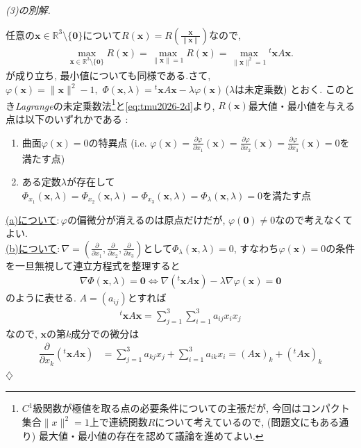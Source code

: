 \documentclass[titlepage]{jsarticle}
\numberwithin{equation}{section}
\newcommand{\R}{\mathbb{R}}%
\newenvironment{kaitou}[1][解]{%
\begin{proofbox}%
\textit{#1. }\ignorespaces
}{%
\hfill$\diamondsuit$%
\end{proofbox}%
}
\begin{document}
\begin{kaitou}[(3)の別解]
任意の$\bm{x}\in\R^3\setminus\{\bm{0}\}$について$R(\bm{x}) = R\left(\frac{\bm{x}}{\|\bm{x}\|}\right)$なので, 
\begin{align}
\max_{\bm{x}\in\R^3\setminus\{\bm{0}\}}R(\bm{x}) = \max_{\|\bm{x}\|=1}R(\bm{x}) =
\max_{\|\bm{x}\|^2=1}{}^t\bm{x}A\bm{x}.
\label{eq:tmu2026-2d}
\end{align}
が成り立ち, 最小値についても同様である.さて, $\varphi(\bm{x}) = \|\bm{x}\|^2 - 1,\,\, \Phi(\bm{x}, \lambda) = {}^t\bm{x}A\bm{x} - \lambda\varphi(\bm{x})$\,($\lambda$は未定乗数) とおく. このとき\textit{Lagrange}の未定乗数法\footnote{$C^1$級関数が極値を取る点の必要条件についての主張だが, 今回はコンパクト集合$\|x\|^2 = 1$上で連続関数$R$について考えているので, (問題文にもある通り) 最大値・最小値の存在を認めて議論を進めてよい.}と\eqref{eq:tmu2026-2d}より, $R(\bm{x})$最大値・最小値を与える点は以下のいずれかである :
\begin{enumerate}[label = (\alph*)]
\item 曲面$\varphi(\bm{x}) = 0$の特異点 (i.e. $\varphi(\bm{x}) = \frac{\partial\varphi}{\partial x_1}(\bm{x}) = \frac{\partial\varphi}{\partial x_2}(\bm{x}) = \frac{\partial\varphi}{\partial x_3}(\bm{x}) = 0$を満たす点)
\item ある定数$\lambda$が存在して $\Phi_{x_1}(\bm{x}, \lambda) = \Phi_{x_2}(\bm{x}, \lambda) = \Phi_{x_3}(\bm{x}, \lambda) = \Phi_{\lambda}(\bm{x}, \lambda) = 0$を満たす点
\end{enumerate}
\uline{(a)について}:\,$\varphi$の偏微分が消えるのは原点だけだが, $\varphi(\bm{0}) \ne 0$なので考えなくてよい.\\
\uline{(b)について}:\,$\nabla = \left(\frac{\partial}{\partial x_1}, \frac{\partial}{\partial x_2}, \frac{\partial}{\partial x_3}\right)$として$\Phi_\lambda(\bm{x}, \lambda) = 0$, すなわち$\varphi(\bm{x}) = 0$の条件を一旦無視して連立方程式を整理すると
\begin{align}
\nabla \Phi(\bm{x}, \lambda) = \bm{0} \iff \nabla\left({}^t\bm{x}A\bm{x}\right) - \lambda\nabla\varphi(\bm{x}) = \bm{0} \label{eq:tmu2026-2e}
\end{align}
のように表せる. $A = (a_{ij})$とすれば
\begin{align*}
{}^t\bm{x}A\bm{x} = \sum_{j=1}^3\sum_{i=1}^3 a_{ij}x_ix_j
\end{align*}
なので, $\bm{x}$の第$k$成分での微分は
\begin{align}
\dfrac{\partial}{\partial x_k} \left({}^t\bm{x}A\bm{x}\right) &= \sum_{j = 1}^3 a_{kj}x_j + \sum_{i = 1}^3 a_{ik}x_i = (A\bm{x})_k + ({}^t\!A\bm{x})_k\label{eq:tmu2026-2f}

\end{align}
\end{kaitou}
\end{document}
